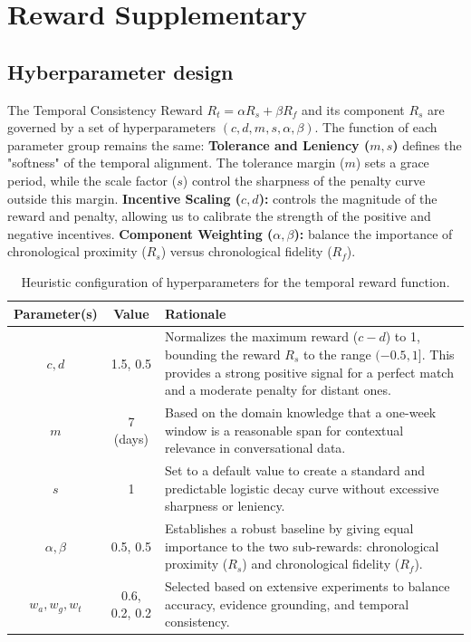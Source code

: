 \documentclass{article} %
\begin{document}
\section{Reward Supplementary}
\label{app:hyperparams}


\subsection{Hyberparameter design}
\label{app:hyberparamters}
The Temporal Consistency Reward $R_t = \alpha R_s + \beta R_f$ and its component $R_s$ are governed by a set of hyperparameters $(c, d, m, s, \alpha, \beta)$. The function of each parameter group remains the same: \textbf{Tolerance and Leniency ($m, s$)} defines the "softness" of the temporal alignment. The tolerance margin ($m$) sets a grace period, while the scale factor ($s$) control the sharpness of the penalty curve outside this margin. \textbf{Incentive Scaling ($c, d$):} controls the magnitude of the reward and penalty, allowing us to calibrate the strength of the positive and negative incentives. \textbf{Component Weighting ($\alpha, \beta$):} balance the importance of chronological proximity ($R_s$) versus chronological fidelity ($R_f$).


\begin{table}[htbp]
\centering
\caption{Heuristic configuration of hyperparameters for the temporal reward function.}
\label{tab:hyperparam_config}
\begin{tabular}{c c p{7.5cm}} %
\toprule
\textbf{Parameter(s)} & \textbf{Value} & \textbf{Rationale} \\
\midrule
$c, d$ & 1.5, 0.5 & Normalizes the maximum reward ($c-d$) to 1, bounding the reward $R_s$ to the range $(-0.5, 1]$. This provides a strong positive signal for a perfect match and a moderate penalty for distant ones. \\
\midrule
$m$ & 7 (days) & Based on the domain knowledge that a one-week window is a reasonable span for contextual relevance in conversational data. \\
\midrule
$s$ & 1 & Set to a default value to create a standard and predictable logistic decay curve without excessive sharpness or leniency. \\
\midrule
$\alpha, \beta$ & 0.5, 0.5 & Establishes a robust baseline by giving equal importance to the two sub-rewards: chronological proximity ($R_s$) and chronological fidelity ($R_f$). \\
\midrule
$w_a, w_g, w_t$ & 0.6, 0.2, 0.2 & Selected based on extensive experiments to balance accuracy, evidence grounding, and temporal consistency. \\
\bottomrule
\end{tabular}
\end{table}
\end{document}
